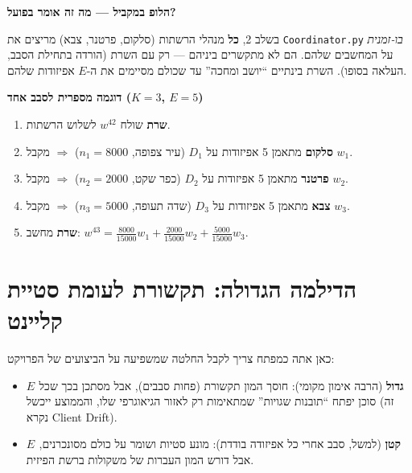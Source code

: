 \documentclass[11pt,a4paper]{article}
\newenvironment{infobox}[2][gray]{%
  \par\smallskip
  \begin{mdframed}[
    linecolor=#1!60!black,
    linewidth=0.7pt,
    backgroundcolor=#1!6,
    roundcorner=3pt,
    innertopmargin=7pt,
    innerbottommargin=7pt,
    innerleftmargin=8pt,
    innerrightmargin=8pt,
    skipabove=6pt,
    skipbelow=6pt
  ]%
  {\color{#1!70!black}\bfseries #2}\par\smallskip
}{%
  \end{mdframed}%
  \par\smallskip
}
\begin{document}
\begin{infobox}[green]{הלופ במקביל --- מה זה אומר בפועל?}
בשלב 2, \textbf{כל} מנהלי הרשתות (סלקום, פרטנר, צבא) מריצים את \texttt{Coordinator.py} \emph{בו-זמנית} על המחשבים שלהם.
הם לא מתקשרים ביניהם --- רק עם השרת (הורדה בתחילת הסבב, העלאה בסופו).
השרת בינתיים ``יושב ומחכה'' עד שכולם מסיימים את ה-$E$ אפיזודות שלהם.
\end{infobox}

\begin{infobox}[blue]{דוגמה מספרית לסבב אחד ($K=3$, $E=5$)}
\begin{enumerate}[label=\arabic*., nosep]
  \item \textbf{שרת} שולח $w^{42}$ לשלוש הרשתות.
  \item \textbf{סלקום} מתאמן 5 אפיזודות על $D_1$ (עיר צפופה, $n_1{=}8000$) $\Rightarrow$ מקבל $w_1$.
  \item \textbf{פרטנר} מתאמן 5 אפיזודות על $D_2$ (כפר שקט, $n_2{=}2000$) $\Rightarrow$ מקבל $w_2$.
  \item \textbf{צבא} מתאמן 5 אפיזודות על $D_3$ (שדה תעופה, $n_3{=}5000$) $\Rightarrow$ מקבל $w_3$.
  \item \textbf{שרת} מחשב: $w^{43} = \frac{8000}{15000}w_1 + \frac{2000}{15000}w_2 + \frac{5000}{15000}w_3$.
\end{enumerate}
\end{infobox}

\section{הדילמה הגדולה: תקשורת לעומת סטיית קליינט}

כאן אתה כמפתח צריך לקבל החלטה שמשפיעה על הביצועים של הפרויקט:

\begin{itemize}
  \item \textbf{$E$ גדול} (הרבה אימון מקומי):
    חוסך המון תקשורת (פחות סבבים), אבל מסתכן בכך שכל סוכן יפתח ``תובנות שגויות'' שמתאימות רק לאזור הגיאוגרפי שלו, והממוצע ייכשל (זה נקרא Client Drift).

  \item \textbf{$E$ קטן} (למשל, סבב אחרי כל אפיזודה בודדת):
    מונע סטיות ושומר על כולם מסונכרנים, אבל דורש המון העברות של משקולות ברשת הפיזית.
\end{itemize}

\end{document}
